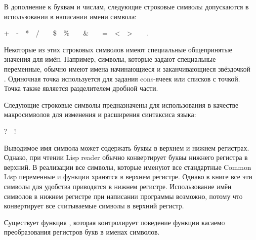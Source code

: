 В дополнение к буквам и числам, следующие строковые символы допускаются в
использовании в написании имени символа:
\begin{lisp}
+~~-~~*~~/~~{\Xatsign}~~\$~~\%~~{\Xcircumflex}~~\&~~{\Xunderscore}~~=~~<~~>~~{\Xtilde}~~.
\end{lisp}

Некоторые из этих строковых символов имеют специальные общепринятые значения
для имён.
Например, символы, которые задают специальные переменные, обычно имеют имена
начинающиеся и заканчивающиеся звёздочкой \cd{*}.
Одиночная точка используется для задания cons-ячеек или списков с точкой. Точка
также является разделителем дробной части.

Следующие строковые символы предназначены для использования в качестве
макросимволов для изменения и расширения синтаксиса языка:
\begin{lisp}
?~~!~~{\Xlbracket}~~{\Xrbracket}~~{\Xlbrace}~~{\Xrbrace}
\end{lisp}

Выводимое имя символа может содержать буквы в верхнем и нижнем регистрах.
Однако, при чтении Lisp reader обычно конвертирует буквы нижнего регистра в
верхний.
В реализации все символы, которые именуют все стандартные Common Lisp переменные
и функции хранятся в верхнем регистре. Однако в книге все эти символы для
удобства приводятся в нижнем регистре. Использование имён символов в нижнем
регистре при написании программы возможно, потому что  конвертирует все
считываемые символы в верхний регистр.

Существует функция , которая контролирует поведение функции
 касаемо преобразования регистров букв в именах символов.

